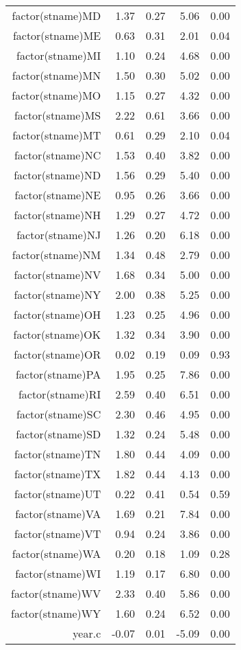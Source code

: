 \begin{table}[ht]
\begin{tabular}{rrrrr}
  factor(stname)MD & 1.37 & 0.27 & 5.06 & 0.00 \\ 
  factor(stname)ME & 0.63 & 0.31 & 2.01 & 0.04 \\ 
  factor(stname)MI & 1.10 & 0.24 & 4.68 & 0.00 \\ 
  factor(stname)MN & 1.50 & 0.30 & 5.02 & 0.00 \\ 
  factor(stname)MO & 1.15 & 0.27 & 4.32 & 0.00 \\ 
  factor(stname)MS & 2.22 & 0.61 & 3.66 & 0.00 \\ 
  factor(stname)MT & 0.61 & 0.29 & 2.10 & 0.04 \\ 
  factor(stname)NC & 1.53 & 0.40 & 3.82 & 0.00 \\ 
  factor(stname)ND & 1.56 & 0.29 & 5.40 & 0.00 \\ 
  factor(stname)NE & 0.95 & 0.26 & 3.66 & 0.00 \\ 
  factor(stname)NH & 1.29 & 0.27 & 4.72 & 0.00 \\ 
  factor(stname)NJ & 1.26 & 0.20 & 6.18 & 0.00 \\ 
  factor(stname)NM & 1.34 & 0.48 & 2.79 & 0.00 \\ 
  factor(stname)NV & 1.68 & 0.34 & 5.00 & 0.00 \\ 
  factor(stname)NY & 2.00 & 0.38 & 5.25 & 0.00 \\ 
  factor(stname)OH & 1.23 & 0.25 & 4.96 & 0.00 \\ 
  factor(stname)OK & 1.32 & 0.34 & 3.90 & 0.00 \\ 
  factor(stname)OR & 0.02 & 0.19 & 0.09 & 0.93 \\ 
  factor(stname)PA & 1.95 & 0.25 & 7.86 & 0.00 \\ 
  factor(stname)RI & 2.59 & 0.40 & 6.51 & 0.00 \\ 
  factor(stname)SC & 2.30 & 0.46 & 4.95 & 0.00 \\ 
  factor(stname)SD & 1.32 & 0.24 & 5.48 & 0.00 \\ 
  factor(stname)TN & 1.80 & 0.44 & 4.09 & 0.00 \\ 
  factor(stname)TX & 1.82 & 0.44 & 4.13 & 0.00 \\ 
  factor(stname)UT & 0.22 & 0.41 & 0.54 & 0.59 \\ 
  factor(stname)VA & 1.69 & 0.21 & 7.84 & 0.00 \\ 
  factor(stname)VT & 0.94 & 0.24 & 3.86 & 0.00 \\ 
  factor(stname)WA & 0.20 & 0.18 & 1.09 & 0.28 \\ 
  factor(stname)WI & 1.19 & 0.17 & 6.80 & 0.00 \\ 
  factor(stname)WV & 2.33 & 0.40 & 5.86 & 0.00 \\ 
  factor(stname)WY & 1.60 & 0.24 & 6.52 & 0.00 \\ 
  year.c & -0.07 & 0.01 & -5.09 & 0.00 \\ 
   \hline
\end{tabular}
\end{table}
